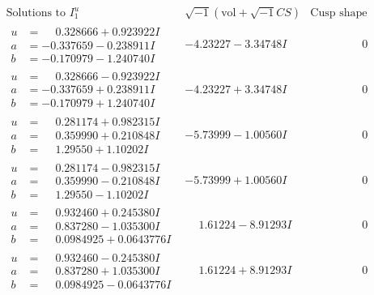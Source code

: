 \documentclass[1p]{elsarticle_modified}
\theoremstyle{definition}
\newcommand{\I}{\sqrt{-1}}
\begin{document}
$$\begin{array}{c|c|c}  
\text{Solutions to }I^u_{1}& \I (\text{vol} + \sqrt{-1}CS) & \text{Cusp shape}\\
 \hline 
\begin{aligned}
u &= \phantom{-}0.328666 + 0.923922 I \\
a &= -0.337659 - 0.238911 I \\
b &= -0.170979 - 1.240740 I\end{aligned}
 & -4.23227 - 3.34748 I & \phantom{-0.000000 } 0 \\ \hline\begin{aligned}
u &= \phantom{-}0.328666 - 0.923922 I \\
a &= -0.337659 + 0.238911 I \\
b &= -0.170979 + 1.240740 I\end{aligned}
 & -4.23227 + 3.34748 I & \phantom{-0.000000 } 0 \\ \hline\begin{aligned}
u &= \phantom{-}0.281174 + 0.982315 I \\
a &= \phantom{-}0.359990 + 0.210848 I \\
b &= \phantom{-}1.29550 + 1.10202 I\end{aligned}
 & -5.73999 - 1.00560 I & \phantom{-0.000000 } 0 \\ \hline\begin{aligned}
u &= \phantom{-}0.281174 - 0.982315 I \\
a &= \phantom{-}0.359990 - 0.210848 I \\
b &= \phantom{-}1.29550 - 1.10202 I\end{aligned}
 & -5.73999 + 1.00560 I & \phantom{-0.000000 } 0 \\ \hline\begin{aligned}
u &= \phantom{-}0.932460 + 0.245380 I \\
a &= \phantom{-}0.837280 - 1.035300 I \\
b &= \phantom{-}0.0984925 + 0.0643776 I\end{aligned}
 & \phantom{-}1.61224 - 8.91293 I & \phantom{-0.000000 } 0 \\ \hline\begin{aligned}
u &= \phantom{-}0.932460 - 0.245380 I \\
a &= \phantom{-}0.837280 + 1.035300 I \\
b &= \phantom{-}0.0984925 - 0.0643776 I\end{aligned}
 & \phantom{-}1.61224 + 8.91293 I & \phantom{-0.000000 } 0 \\ \hline\begin{aligned}

\end{aligned}
\end{array}$$
\end{document}
